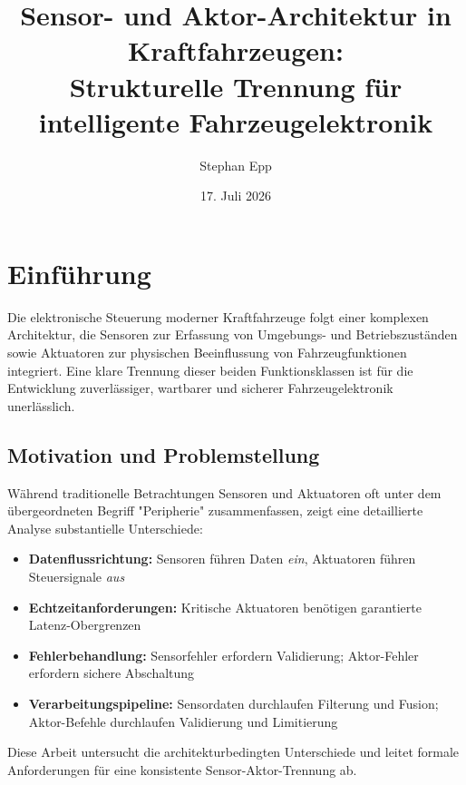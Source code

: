 ﻿\documentclass[a4paper,12pt]{article}
\title{Sensor- und Aktor-Architektur in Kraftfahrzeugen:\\Strukturelle Trennung für intelligente Fahrzeugelektronik}
\author{Stephan Epp}
\date{17. Juli 2026}
\begin{document}
\maketitle

\tableofcontents
\newpage

\section{Einführung}

Die elektronische Steuerung moderner Kraftfahrzeuge folgt einer komplexen Architektur, die 
Sensoren zur Erfassung von Umgebungs- und Betriebszuständen sowie Aktuatoren zur physischen 
Beeinflussung von Fahrzeugfunktionen integriert. Eine klare Trennung dieser beiden 
Funktionsklassen ist für die Entwicklung zuverlässiger, wartbarer und sicherer 
Fahrzeugelektronik unerlässlich.

\subsection{Motivation und Problemstellung}

Während traditionelle Betrachtungen Sensoren und Aktuatoren oft unter dem übergeordneten 
Begriff "Peripherie" zusammenfassen, zeigt eine detaillierte Analyse substantielle 
Unterschiede:

\begin{itemize}
	\item \textbf{Datenflussrichtung:} Sensoren führen Daten \textit{ein}, Aktuatoren führen 
	Steuersignale \textit{aus}
	\item \textbf{Echtzeitanforderungen:} Kritische Aktuatoren benötigen garantierte 
	Latenz-Obergrenzen
	\item \textbf{Fehlerbehandlung:} Sensorfehler erfordern Validierung; Aktor-Fehler 
	erfordern sichere Abschaltung
	\item \textbf{Verarbeitungspipeline:} Sensordaten durchlaufen Filterung und Fusion; 
	Aktor-Befehle durchlaufen Validierung und Limitierung
\end{itemize}

Diese Arbeit untersucht die architekturbedingten Unterschiede und leitet formale 
Anforderungen für eine konsistente Sensor-Aktor-Trennung ab.

\end{document}
